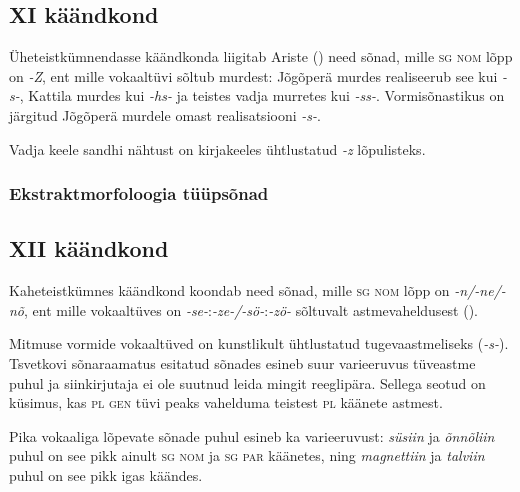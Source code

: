 \documentclass[12pt,a4paper]{article}
\newcommand{\vadja}[1]{\textit{#1}}
\newcommand{\msd}[1]{\textsc{#1}}
\begin{document}
\subsection{\RN{11} käändkond}

Üheteistkümnendasse käändkonda liigitab Ariste (\citeyear[48]{ariste_grammar_1968}) need sõnad, mille \msd{sg nom} lõpp on \vadja{{-Z}}, ent mille vokaaltüvi sõltub murdest: Jõgõperä murdes realiseerub see kui \vadja{-s-}, Kattila murdes kui \textit{-hs-} ja teistes vadja murretes kui \textit{-ss-}. Vormisõnastikus on järgitud Jõgõperä murdele omast realisatsiooni \textit{-s-}.

Vadja keele sandhi nähtust on kirjakeeles ühtlustatud \vadja{-z} lõpulisteks.


\subsubsection*{Ekstraktmorfoloogia tüüpsõnad}
\vspace{-3.5em}




\subsection{\RN{12} käändkond}

Kaheteistkümnes käändkond koondab need sõnad, mille \msd{sg nom} lõpp on \vadja{-n/-ne/-nõ}, ent mille vokaaltüves on \vadja{-se-}:\vadja{-ze-/-sö-}:\vadja{-zö-} sõltuvalt astmevaheldusest (\cite[49]{ariste_grammar_1968}).

Mitmuse vormide vokaaltüved on kunstlikult ühtlustatud tugevaastmeliseks (\textit{-s-}). Tsvetkovi sõnaraamatus esitatud sõnades esineb suur varieeruvus tüve\-astme puhul ja siin\-kirjutaja ei ole suutnud leida mingit reeglipära. Sellega seotud on küsimus, kas \msd{pl gen} tüvi peaks vahelduma teistest \msd{pl} käänete astmest.

Pika vokaaliga lõpevate sõnade puhul esineb ka varieeruvust: \textit{süsiin} ja \textit{õnnõliin} puhul on see pikk ainult \msd{sg nom} ja \msd{sg par} käänetes, ning \textit{magnettiin} ja \textit{talviin} puhul on see pikk igas käändes.
\end{document}
